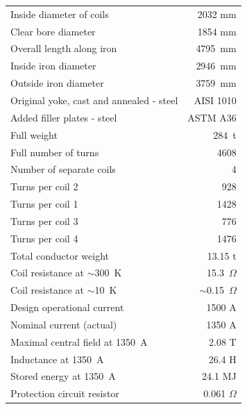 \begin{table}[thp]
 \begin{center}
   \small
   \begin{tabular}{lr}
     \hline
     \hline
       Inside diameter of coils        & 2032 mm \\
       Clear bore diameter             & 1854 mm \\
       Overall length along iron       & 4795~mm \\
       Inside iron diameter            & 2946~mm \\
       Outside iron diameter           & 3759~mm \\
       Original yoke, cast and annealed - steel & AISI 1010 \\
       Added filler plates - steel     & ASTM A36 \\
       Full weight                     & 284~t      \\
       Full number of turns            & 4608 \\
       Number of separate coils        & 4 \\
       Turns per coil 2                &  928 \\   
       Turns per coil 1                & 1428 \\   
       Turns per coil 3                &  776 \\   
       Turns per coil 4                & 1476 \\   
       Total conductor weight          & 13.15 t \\
       Coil resistance at $\sim$300~K & 15.3~$\Omega$ \\   
       Coil resistance at  $\sim$10~K & $\sim$0.15~$\Omega$ \\   
       Design operational current      & 1500 A \\
       Nominal current (actual)        & 1350 A \\
       Maximal central field at 1350~A & 2.08 T \\   
       Inductance at 1350~A            & 26.4 H \\
       Stored energy at 1350~A         & 24.1 MJ  \\
       Protection circuit resistor     & 0.061 $\Omega$  \\

\end{tabular}
\end{center}
\end{table}
